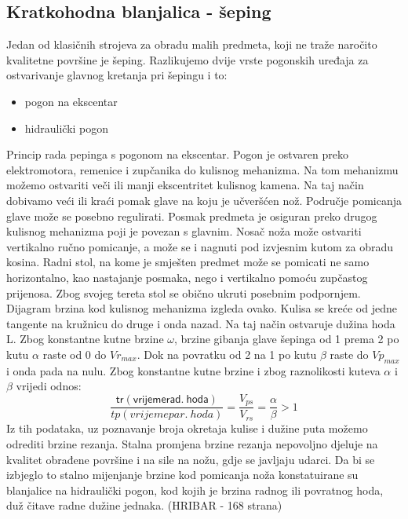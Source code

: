 \documentclass[a4paper,12pt]{article}
\numberwithin{figure}{section}
\begin{document}
\subsection{Kratkohodna blanjalica - šeping}
Jedan od klasičnih strojeva za obradu malih predmeta, koji ne traže naročito kvalitetne površine je šeping. Razlikujemo dvije vrste pogonskih uređaja za ostvarivanje glavnog kretanja pri šepingu i to:
\begin{itemize}
\item pogon na ekscentar
\item hidraulički pogon
\end{itemize}
Princip rada pepinga s pogonom na ekscentar. Pogon je  ostvaren preko elektromotora, remenice i zupčanika do kulisnog mehanizma. Na tom mehanizmu možemo ostvariti veči ili manji ekscentritet kulisnog kamena. Na taj način dobivamo veći ili kraći pomak glave na koju je učveršćen nož. Područje pomicanja glave može se posebno regulirati. Posmak predmeta je osiguran preko drugog kulisnog mehanizma poji je povezan s glavnim.
Nosač noža može ostvariti vertikalno ručno pomicanje, a može se i nagnuti pod izvjesnim kutom za obradu kosina. Radni stol, na kome je smješten predmet može se pomicati ne samo horizontalno, kao nastajanje posmaka, nego i vertikalno pomoću zupčastog prijenosa. Zbog svojeg tereta stol se obično ukruti posebnim podpornjem. 
Dijagram brzina kod kulisnog mehanizma izgleda ovako. Kulisa se kreće od jedne tangente na kružnicu do druge i onda nazad. Na taj način ostvaruje dužina hoda L. Zbog konstantne kutne brzine $\omega$, brzine gibanja glave šepinga od 1 prema 2 po kutu $\alpha$ raste od 0 do $Vr_{max}$. Dok na povratku od 2 na 1 po kutu $\beta$ raste do $Vp_{max}$ i onda pada na nulu. Zbog konstantne kutne brzine i zbog raznolikosti kuteva $\alpha$ i $\beta$ vrijedi odnos:
\begin{equation}
\frac{\mathsf{tr(vrijeme rad.\:hoda)}}{tp(vrijeme par.\:hoda)} = \frac{V_{ps}}{V_{rs}} = \frac{\alpha}{\beta}>1
\end{equation}
Iz tih podataka, uz poznavanje broja okretaja kulise i dužine puta možemo odrediti brzine rezanja. Stalna promjena brzine rezanja nepovoljno djeluje na kvalitet obrađene površine i na sile na nožu, gdje se javljaju udarci. Da bi se izbjeglo to stalno mijenjanje brzine kod pomicanja noža konstatuirane su blanjalice na hidraulički pogon, kod kojih je brzina radnog ili povratnog hoda, duž čitave radne dužine jednaka. (HRIBAR - 168 strana)
\end{document}
